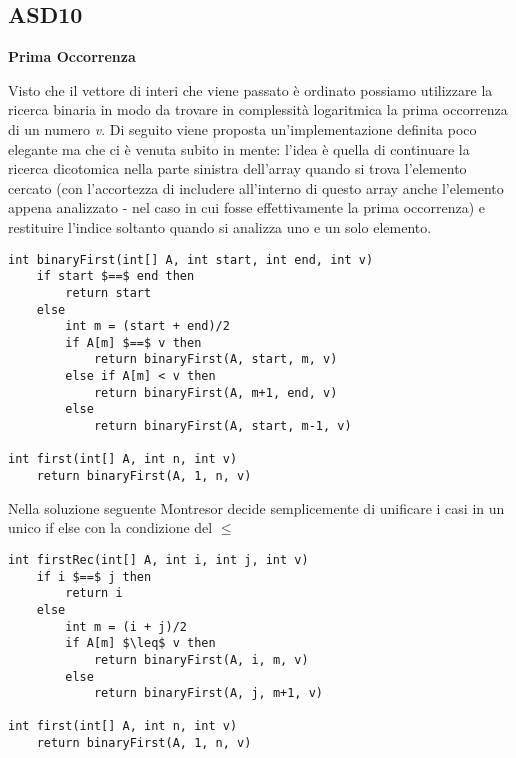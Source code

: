 \documentclass[../cheatSheetAlgoritmi.tex]{subfiles}
\begin{document}
\subsection{ASD10}
\textbf{Prima Occorrenza}

Visto che il vettore di interi che viene passato è ordinato possiamo utilizzare la ricerca binaria in modo da trovare in complessità logaritmica la prima occorrenza di un numero \textit{v}. Di seguito viene proposta un'implementazione definita poco elegante ma che ci è venuta subito in mente: l'idea è quella di continuare la ricerca dicotomica nella parte sinistra dell'array quando si trova l'elemento cercato (con l'accortezza di includere all'interno di questo array anche l'elemento appena analizzato - nel caso in cui fosse effettivamente la prima occorrenza) e restituire l'indice soltanto quando si analizza uno e un solo elemento.
\newpage
\begin{lstlisting}[caption=Prima Occorrenza]
int binaryFirst(int[] A, int start, int end, int v)
	if start $==$ end then
		return start
  	else
    	int m = (start + end)/2
    	if A[m] $==$ v then
      		return binaryFirst(A, start, m, v)
    	else if A[m] < v then
        	return binaryFirst(A, m+1, end, v)
      	else
        	return binaryFirst(A, start, m-1, v)

int first(int[] A, int n, int v)
	return binaryFirst(A, 1, n, v)
\end{lstlisting}
Nella soluzione seguente Montresor decide semplicemente di unificare i casi in un unico if else con la condizione del $\leq$
\begin{lstlisting}[caption=Prima Occorrenza (by Montresor)]
int firstRec(int[] A, int i, int j, int v)
	if i $==$ j then
    	return i
  	else
    	int m = (i + j)/2
    	if A[m] $\leq$ v then
      		return binaryFirst(A, i, m, v)
    	else
      		return binaryFirst(A, j, m+1, v)
      
int first(int[] A, int n, int v)
	return binaryFirst(A, 1, n, v)
\end{lstlisting}
\end{document}
